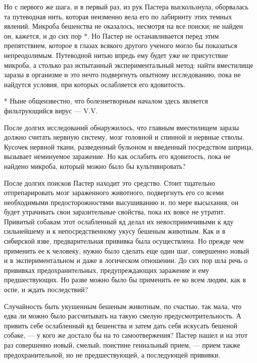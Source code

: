 Но с  первого же шага,  и в первый  раз, из рук  Пастера выскользнула,
оборвалась та путеводная нить, которая неизменно вела его по лабиринту
этих темных явлений.  Микроба бешенства не оказалось,  несмотря на все
поиски;  не  найден  он,  кажется,  и  до сих  пор  *.  Но  Пастер  не
останавливается  перед этим  препятствием,  которое  в глазах  всякого
другого ученого  могло бы  показаться непреодолимым.  Путеводной нитью
впредь ему будет уже не  присутствие микроба, а столько раз испытанный
экспериментальный  метод: найти  вместилище заразы  в организме  и это
нечто подвергнуть опытному исследованию, пока не найдутся условия, при
которых ослабляется его ядовитость.

*  Ныне  общеизвестно,  что   болезнетворным  началом  здесь  является
фильтрующийся вирус --- V.V.

После долгих исследований обнаружилось, что главным вместилищем заразы
должно  считать нервную  систему, мозг  головной и  спинной и  нервные
стволы.  Кусочек  нервной  ткани,  разведенный  бульоном  н  введенный
посредством  шприца, вызывает  неминуемое заражение.  Но как  ослабить
его  ядовитость,  пока  не  найдено микроба,  который  можно  было  бы
культивировать?

После  долгих поисков  Пастер  находит это  средство. Стоит  тщательно
отпрепарировать мозг  зараженного животного, подвергнуть его  со всеми
необходимыми  предосторожностями  высушиванию  и, по  мере  высыхания,
он  будет  утрачивать  свои  заразительные  свойства,  пока  их  вовсе
не   утратит.  Привитый   собакам   этот  ослабленный   яд  делал   их
невосприимчивыми к яду сильнейшему и к непосредственному укусу бешеным
животным.  Как  и  в  сибирской язве,  предварительная  прививка  была
осуществлена.  Но  прежде чем  применить  ее  к человеку,  нужно  было
сделать  еще  один  шаг,  совершенно новый  и  в  экспериментальном  и
даже  в  логическом  отношении.  До  сих  пор  шла  речь  о  прививках
предохранительных, предупреждающих заражение  и ему предшествующих. Но
разве можно было  бы применить ее ко  всем людям, как в  оспе, и ждать
последствий?

Случайность быть укушенным бешеным животным, по счастью, так мала, что
едва ли можно было  рассчитывать на такую смелую предусмотрительность.
А привить  себе ослабленный  яд бешенства и  затем дать  себя искусать
бешеной собаке, --- у кого же  достало бы на то самоотвержения? Пастер
нашел  и на  этот раз  совершенно новый,  смелый, поистине  гениальный
прием,  --- прием  также  предохранительной, но  не предшествующей,  а
последующей прививки.

